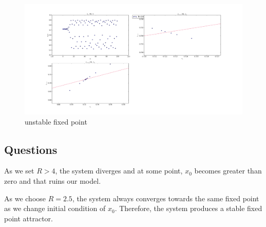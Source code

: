 \documentclass[12pt]{article}\pagestyle{myheadings}
\theoremstyle{plain}
\begin{document}
\begin{figure}[h!]
\centering
\includegraphics[scale=.2]{3,6-7223}
\caption{unstable fixed point}
\label{fig:my_label}
\end{figure}

\subsection{Questions}

As we set $R>4$, the system diverges and at some point, $x_0$ becomes greater than zero and that ruins our model. 

As we choose $R=2.5$, the system always converges towards the same fixed point as we change initial condition of $x_0$. Therefore, the system produces a stable fixed point attractor. 
\end{document}
